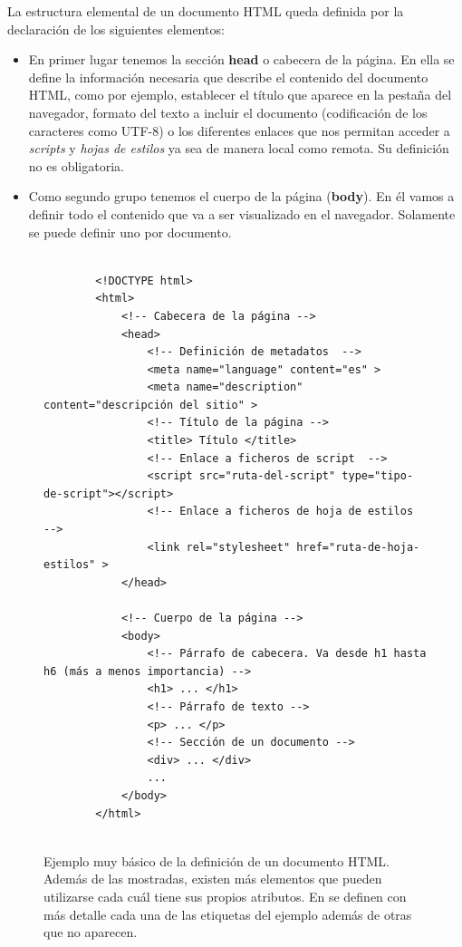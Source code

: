 \documentclass[../main.tex]{subfiles}
\begin{document}
    La estructura elemental de un documento HTML queda definida por la declaración de los siguientes elementos:

    \begin{itemize}
        \item En primer lugar tenemos la sección \textbf{head} o cabecera de la página. En ella se define la información necesaria que describe el contenido del documento HTML, como por ejemplo, establecer el título que aparece en la pestaña del navegador, formato del texto a incluir el documento (codificación de los caracteres como UTF-8) o los diferentes enlaces que nos permitan acceder a \textit{scripts} y \textit{hojas de estilos} ya sea de manera local como remota. Su definición no es obligatoria.
        
        \item Como segundo grupo tenemos el cuerpo de la página (\textbf{body}). En él vamos a definir todo el contenido que va a ser visualizado en el navegador. Solamente se puede definir uno por documento.
    
    \end{itemize}
    

    
    \begin{figure}[!h]
        \centering
        \begin{verbatim}
        
        <!DOCTYPE html>
        <html>
            <!-- Cabecera de la página -->
            <head>
                <!-- Definición de metadatos  -->
                <meta name="language" content="es" > 
                <meta name="description" content="descripción del sitio" > 
                <!-- Título de la página -->
                <title> Título </title>
                <!-- Enlace a ficheros de script  -->
                <script src="ruta-del-script" type="tipo-de-script"></script>
                <!-- Enlace a ficheros de hoja de estilos  -->
                <link rel="stylesheet" href="ruta-de-hoja-estilos" >
            </head>
            
            <!-- Cuerpo de la página -->
            <body>
                <!-- Párrafo de cabecera. Va desde h1 hasta h6 (más a menos importancia) -->
                <h1> ... </h1>
                <!-- Párrafo de texto -->
                <p> ... </p>
                <!-- Sección de un documento -->
                <div> ... </div>
                ...
            </body>
        </html>
        
        \end{verbatim}
        \caption{Ejemplo muy básico de la definición de un documento HTML. Además de las mostradas, existen más elementos que pueden utilizarse cada cuál tiene sus propios atributos. En \cite{etiquetasbasicashtml} se definen con más detalle cada una de las etiquetas del ejemplo además de otras que no aparecen.}
        \label{fig:estructura_documento_html_I}
    \end{figure}
\end{document}
